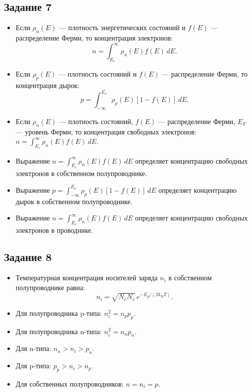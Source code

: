 \documentclass[../main.tex]{subfiles}
\begin{document}
\subsection{Задание 7}
\begin{itemize}
  \item Если $\rho_n(E)$ — плотность энергетических состояний и $f(E)$ — распределение Ферми, то концентрация электронов:
  $$n = \int_{E_c}^{\infty}\rho_n(E)f(E)\,dE.$$
  \item Если $\rho_p(E)$ — плотность состояний и $f(E)$ — распределение Ферми, то концентрация дырок:
  $$p = \int_{-\infty}^{E_v}\rho_p(E)[1-f(E)]\,dE.$$
  \item Если $\rho_n(E)$ — плотность состояний, $f(E)$ — распределение Ферми, $E_F$ — уровень Ферми, то концентрация свободных электронов: $n = \int_{E_c}^{\infty}\rho_n(E)f(E)\,dE$.
  \item Выражение $n = \int_{E_c}^{\infty}\rho_n(E)f(E)\,dE$ определяет концентрацию свободных электронов в собственном полупроводнике.
  \item Выражение $p = \int_{-\infty}^{E_v}\rho_p(E)[1-f(E)]\,dE$ определяет концентрацию дырок в собственном полупроводнике.
  \item Выражение $n = \int_{E_c}^{\infty}\rho_n(E)f(E)\,dE$ определяет концентрацию свободных электронов в проводнике.
\end{itemize}

\subsection{Задание 8}
\begin{itemize}
  \item Температурная концентрация носителей заряда $n_i$ в собственном полупроводнике равна:
  $$n_i = \sqrt{N_cN_v}\,e^{-E_g/(2k_BT)}.$$
  \item Для полупроводника p-типа: $n_i^2 = n_p p_p.$
  \item Для полупроводника n-типа: $n_i^2 = n_n p_n.$
  \item Для n-типа: $n_n > n_i > p_n.$
  \item Для p-типа: $p_p > n_i > n_p.$
  \item Для собственных полупроводников: $n = n_i = p.$
\end{itemize}
\end{document}

